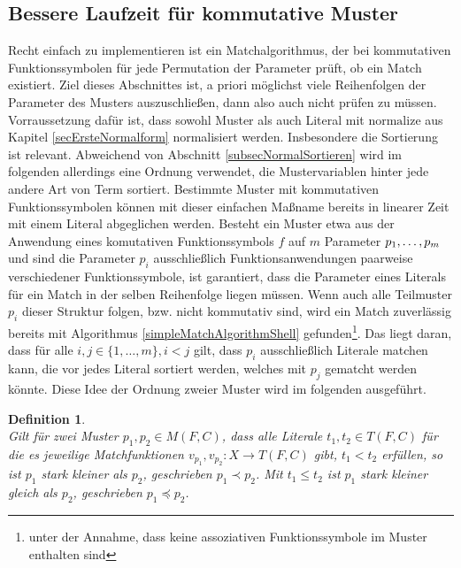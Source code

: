 \subsection{Bessere Laufzeit für kommutative Muster} \label{subsecCMuster}

Recht einfach zu implementieren ist ein Matchalgorithmus, der bei kommutativen Funktionssymbolen für jede Permutation der Parameter prüft, ob ein Match existiert. Ziel dieses Abschnittes ist, a priori möglichst viele Reihenfolgen der Parameter des Musters auszuschließen, dann also auch nicht prüfen zu müssen. Vorraussetzung dafür ist, dass sowohl Muster als auch Literal mit $\mathrm{normalize}$ aus Kapitel \ref{secErsteNormalform} normalisiert werden. Insbesondere die Sortierung ist relevant. Abweichend von Abschnitt \ref{subsecNormalSortieren} wird im folgenden allerdings eine Ordnung verwendet, die Mustervariablen hinter jede andere Art von Term sortiert.
Bestimmte Muster mit kommutativen Funktionssymbolen können mit dieser einfachen Maßname bereits in linearer Zeit mit einem Literal abgeglichen werden. Besteht ein Muster etwa aus der Anwendung eines komutativen Funktionssymbols $f$ auf $m$ Parameter ${p}_{1}, \dots, {p}_{m}$ und sind die Parameter $p_i$ ausschließlich Funktionsanwendungen paarweise verschiedener Funktionssymbole, ist garantiert, dass die Parameter eines Literals für ein Match in der selben Reihenfolge liegen müssen. Wenn auch alle Teilmuster $p_i$ dieser Struktur folgen, bzw. nicht kommutativ sind, wird ein Match zuverlässig bereits mit Algorithmus \ref{simpleMatchAlgorithmShell} gefunden\footnote{unter der Annahme, dass keine assoziativen Funktionssymbole im Muster enthalten sind}. Das liegt daran, dass für alle $i, j \in \{1, \dots, m\}, i < j$ gilt, dass $p_i$ ausschließlich Literale matchen kann, die vor jedes Literal sortiert werden, welches mit $p_j$ gematcht werden könnte. Diese Idee der Ordnung zweier Muster wird im folgenden ausgeführt.


\newtheorem{defStarkGeordnet}[bsp]{Definition}
\begin{defStarkGeordnet}~\\
Gilt für zwei Muster $p_1, p_2 \in M(F, C)$, dass alle Literale $t_1, t_2 \in T(F, C)$ für die es jeweilige Matchfunktionen $v_{p_1}, v_{p_2} \colon X \rightarrow T(F, C)$ gibt, $t_1 < t_2$ erfüllen, so ist $p_1$ \emph{stark kleiner} als $p_2$, geschrieben $p_1 \prec p_2$. Mit  $t_1 \leq t_2$ ist $p_1$ \emph{stark kleiner gleich} als $p_2$, geschrieben $p_1 \preceq p_2$.
\end{defStarkGeordnet}

